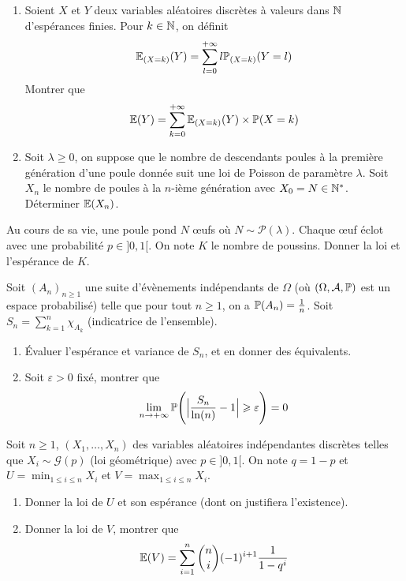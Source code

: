 \begin{exercise}
	\phantom{}
	\begin{enumerate}
		\item
		Soient $X$ et $Y$ deux variables aléatoires discrètes à valeurs dans $\N$
		d'espérances finies. Pour $k\in\N$, on définit
		$$\E_{(X=k)}(Y)=\sum_{l=0}^{+\infty}l\P_{(X=k)}(Y=l)$$ Montrer que
		$$\E(Y)=\sum_{k=0}^{+\infty}\E_{(X=k)}(Y)\times\P(X=k)$$
		\item
		Soit $\lambda\geqslant0$, on suppose que le nombre de descendants poules à
		la première génération d'une poule donnée suit une loi de Poisson de
		paramètre $\lambda$. Soit $X_{n}$ le nombre de poules à la $n$-ième
		génération avec $X_{0}=N\in\N^{*}$. Déterminer $\E(X_{n})$.
	\end{enumerate}
\end{exercise}

\begin{exercise}
	Au cours de sa vie, une poule pond $N$ \oe ufs où $N\sim\mathcal{P}(\lambda)$.
	Chaque \oe uf éclot avec une probabilité $p\in]0,1[$. On note $K$ le nombre de
	poussins. Donner la loi et l'espérance de $K$.
\end{exercise}

\begin{exercise}
	Soit $(A_{n})_{n\geqslant1}$ une suite d'évènements indépendants de $\Omega$
	(où $(\Omega,\mathcal{A},\P)$ est un espace probabilisé) telle que pour tout
	$n\geqslant1$, on a $\P(A_{n})=\frac{1}{n}$. Soit
	$S_{n}=\sum_{k=1}^{n}\chi_{A_{k}}$ (indicatrice de l'ensemble).
	\begin{enumerate}
		\item
		Évaluer l'espérance et variance de $S_{n}$, et en donner des équivalents.
		\item
		Soit $\varepsilon>0$ fixé, montrer que 
		$$\lim\limits_{n\to+\infty}\P\Biggl(\Bigl\vert\frac{S_{n}}{\ln(n)}-1\Bigr\vert\geqslant\varepsilon\Biggr)=0$$
	\end{enumerate}
\end{exercise}

\begin{exercise}
	Soit $n\geqslant1$, $(X_{1},\dots,X_{n})$ des variables aléatoires
	indépendantes discrètes telles que $X_{i}\sim\mathcal{G}(p)$ (loi géométrique)
	avec $p\in]0,1[$. On note $q=1-p$ et $U=\min_{1\leqslant i\leqslant n}X_{i}$
	et $V=\max_{1\leqslant i\leqslant n}X_{i}$.
	\begin{enumerate}
		\item
		Donner la loi de $U$ et son espérance (dont on justifiera l'existence).
		\item
		Donner la loi de $V$, montrer que
		$$\E(V)=\sum_{i=1}^{n}\binom{n}{i}(-1)^{i+1}\frac{1}{1-q^{i}}$$
	\end{enumerate}
\end{exercise}

